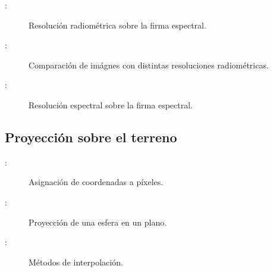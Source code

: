\begin{frame}{\secname : \subsecname}
  \begin{figure}
    \centering
    \caption{Resolución radiométrica sobre la firma espectral.}
    \label{}
  \end{figure}
\end{frame}

\begin{frame}{\secname : \subsecname}
  \begin{figure}
    \centering
    \caption{Comparación de imágnes con distintas resoluciones radiométricas.}
    \label{}
  \end{figure}
\end{frame}

\begin{frame}{\secname : \subsecname}
  \begin{figure}
    \centering
    \caption{Resolución espectral sobre la firma espectral.}
    \label{}
  \end{figure}
\end{frame}

\subsection{Proyección sobre el terreno}

\begin{frame}{\secname : \subsecname}
  \begin{figure}
    \centering
    \caption{Asignación de coordenadas a píxeles.}
    \label{}
  \end{figure}
\end{frame}

\begin{frame}{\secname : \subsecname}
  \begin{figure}
    \centering
    \caption{Proyección de una esfera en un plano.}
    \label{}
  \end{figure}
\end{frame}

\begin{frame}{\secname : \subsecname}
  \begin{figure}
    \centering
    \caption{Métodos de interpolación.}
    \label{}
  \end{figure}
\end{frame}

